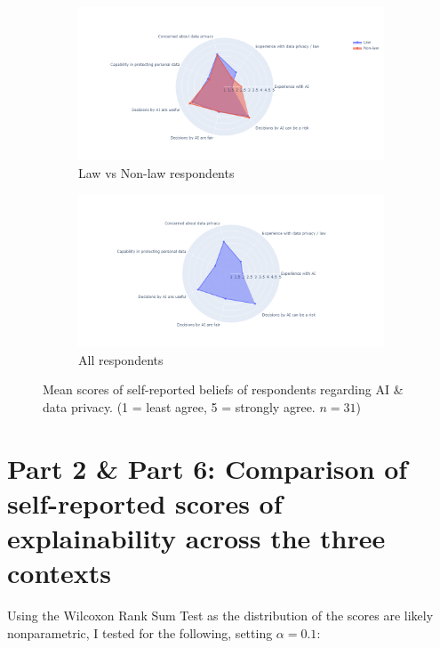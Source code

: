 \begin{figure}[!ht]
    \begin{subfigure}[b]{1\textwidth}
      \centering
      \includegraphics[width=1\linewidth]{figures/demo_3.png}
      \caption{Law vs Non-law respondents}
    \end{subfigure}
    \hfill
    \begin{subfigure}[b]{1\textwidth}
      \centering
      \includegraphics[width=1\linewidth]{figures/demo_4.png}
      \caption{All respondents}
    \end{subfigure}
    \caption{Mean scores of self-reported beliefs of respondents regarding AI \& data privacy. (1 = least agree, 5 = strongly agree. $n=31$)}
    \label{fig:demo_3}
\end{figure}

\section{Part 2 \& Part 6: Comparison of self-reported scores of explainability across the three contexts}
\label{sec:three_contexts_comparison}
Using the Wilcoxon Rank Sum Test as the distribution of the scores are likely nonparametric, I tested for the following, setting $\alpha = 0.1$: 

